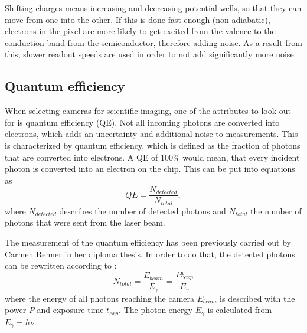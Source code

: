 Shifting charges means increasing and decreasing potential wells, so that they can move from one into the other. If this is done fast enough (non-adiabatic), electrons in the pixel are more likely to get excited from the valence to the conduction band from the semiconductor, therefore adding noise. As a result from this, slower readout speeds are used in order to not add significantly more noise.


\newpage
\subsection{Quantum efficiency}
\label{ch:quantumeff}
When selecting cameras for scientific imaging, one of the attributes to look out for is quantum efficiency (QE). Not all incoming photons are converted into electrons, which adds an uncertainty and additional noise to measurements. This is characterized by quantum efficiency, which is defined as the fraction of photons that are converted into electrons. A  QE of 100\% would mean, that every incident photon is converted into an electron on the chip. This can be put into equations as
\begin{equation}
QE = \frac{N_{detected}}{N_{total}},
\end{equation}
where $N_{detected}$ describes the number of detected photons and $N_{total}$ the number of photons that were sent from the laser beam.

The measurement of the quantum efficiency has been previously carried out by Carmen Renner \cite{Renner2014} in her diploma thesis. In order to do that, the detected photons can be rewritten according to \cite{Murmann2011}:
\begin{equation}
N_{total} = \frac{E_{beam}}{E_\gamma} = \frac{P t_{exp}}{E_\gamma}
\end{equation}
where the energy of all photons reaching the camera $E_{beam}$ is described with the power $P$ and exposure time $t_{exp}$. The photon energy $E_\gamma$ is calculated from $E_\gamma= h\nu$.

